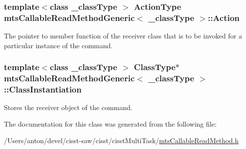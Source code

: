 \subsubsection[{Action}]{\setlength{\rightskip}{0pt plus 5cm}template$<$class \+\_\+class\+Type $>$ {\bf Action\+Type} {\bf mts\+Callable\+Read\+Method\+Generic}$<$ \+\_\+class\+Type $>$\+::Action\hspace{0.3cm}{\ttfamily [protected]}}\label{classmts_callable_read_method_generic_a68e6410f6fc38a56009ac9c6bab0ac68}
The pointer to member function of the receiver class that is to be invoked for a particular instance of the command. \hypertarget{classmts_callable_read_method_generic_a78aa69ee0ab2f0c1120a4320c1315507}{}
\subsubsection[{Class\+Instantiation}]{\setlength{\rightskip}{0pt plus 5cm}template$<$class \+\_\+class\+Type $>$ {\bf Class\+Type}$\ast$ {\bf mts\+Callable\+Read\+Method\+Generic}$<$ \+\_\+class\+Type $>$\+::Class\+Instantiation\hspace{0.3cm}{\ttfamily [protected]}}\label{classmts_callable_read_method_generic_a78aa69ee0ab2f0c1120a4320c1315507}
Stores the receiver object of the command. 

The documentation for this class was generated from the following file\+:\begin{DoxyCompactItemize}
\item 
/\+Users/anton/devel/cisst-\/saw/cisst/cisst\+Multi\+Task/\hyperlink{mts_callable_read_method_8h}{mts\+Callable\+Read\+Method.\+h}\end{DoxyCompactItemize}
